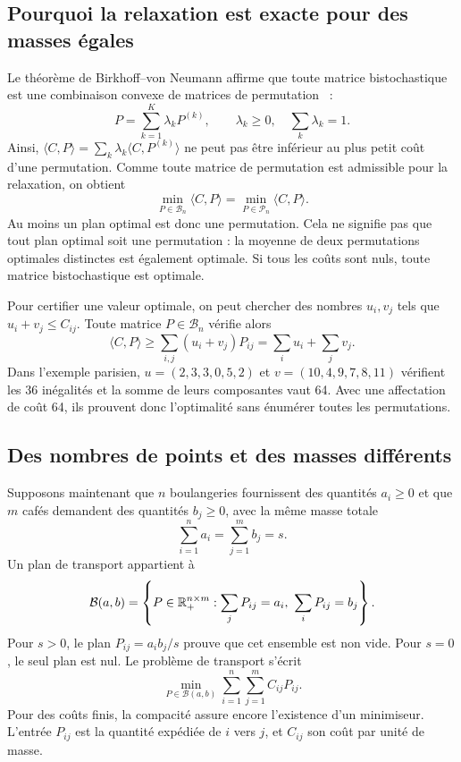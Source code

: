 \subsection{Pourquoi la relaxation est exacte pour des masses égales}
Le théorème de Birkhoff--von Neumann affirme que toute matrice bistochastique est une combinaison convexe de matrices de permutation~\cite{birkhoff,von1953certain} :
\[
 P=\sum_{k=1}^K\lambda_k P^{(k)},
 \qquad \lambda_k\ge0,\quad\sum_k\lambda_k=1.
\]
Ainsi, $\langle C,P\rangle=\sum_k\lambda_k\langle C,P^{(k)}\rangle$ ne peut pas être inférieur au plus petit coût d'une permutation. Comme toute matrice de permutation est admissible pour la relaxation, on obtient
\begin{equation}\label{eq:monge-vs-kanto}
 \min_{P\in\mathcal B_n}\langle C,P\rangle
 =\min_{P\in\mathcal P_n}\langle C,P\rangle.
\end{equation}
Au moins un plan optimal est donc une permutation. Cela ne signifie pas que tout plan optimal soit une permutation : la moyenne de deux permutations optimales distinctes est également optimale. Si tous les coûts sont nuls, toute matrice bistochastique est optimale.

Pour certifier une valeur optimale, on peut chercher des nombres $u_i,v_j$ tels que $u_i+v_j\le C_{ij}$. Toute matrice $P\in\mathcal B_n$ vérifie alors
\[
 \langle C,P\rangle\ge\sum_{i,j}(u_i+v_j)P_{ij}=\sum_i u_i+\sum_jv_j.
\]
Dans l'exemple parisien, $u=(2,3,3,0,5,2)$ et $v=(10,4,9,7,8,11)$ vérifient les 36 inégalités et la somme de leurs composantes vaut 64. Avec une affectation de coût 64, ils prouvent donc l'optimalité sans énumérer toutes les permutations.

\subsection{Des nombres de points et des masses différents}
Supposons maintenant que $n$ boulangeries fournissent des quantités $a_i\ge0$ et que $m$ cafés demandent des quantités $b_j\ge0$, avec la même masse totale
\[
 \sum_{i=1}^n a_i=\sum_{j=1}^m b_j=s.
\]
Un plan de transport appartient à
\[
 \mathcal B(a,b)=\left\{P\in\RR_+^{n\times m}:\sum_jP_{ij}=a_i,\ \sum_iP_{ij}=b_j\right\}.
\]
Pour $s>0$, le plan $P_{ij}=a_i b_j/s$ prouve que cet ensemble est non vide. Pour $s=0$, le seul plan est nul. Le problème de transport s'écrit
\begin{equation}\label{eq-kanto-gen}
 \min_{P\in\mathcal B(a,b)}\sum_{i=1}^n\sum_{j=1}^m C_{ij}P_{ij}.
\end{equation}
Pour des coûts finis, la compacité assure encore l'existence d'un minimiseur. L'entrée $P_{ij}$ est la quantité expédiée de $i$ vers $j$, et $C_{ij}$ son coût par unité de masse.

